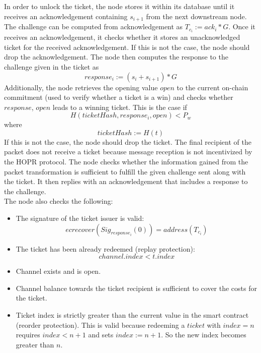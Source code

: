 In order to unlock the ticket, the node stores it within its database until it receives an acknowledgement containing $s_{i+1}$ from the next downstream node. 
The challenge can be computed from acknowledgement as $T_{c_i}:=ack_i*G$.
\newline Once it receives an acknowledgement, it checks whether it stores an unacknowledged ticket for the received acknowledgement. 
If this is not the case, the node should drop the acknowledgement.  
\newline The node then computes the response to the challenge given in the ticket as $$response_i:=(s_i+s_{i+1})*G$$
Additionally, the node retrieves the opening value $open$ to the current on-chain commitment (used to verify whether a ticket is a win) and checks whether $response$, $open$ leads to a winning ticket. 
This is the case if $$H( ticketHash, response_i, open ) <P_w$$ where $$ticketHash:=H(t)$$
If this is not the case, the node should drop the ticket. 
The final recipient of the packet does not receive a ticket because message reception is not incentivized by the HOPR protocol.
\newline The node checks whether the information gained from the packet transformation is sufficient to fulfill the given challenge sent along with the ticket. It then replies with an acknowledgement that includes a response to the challenge.
\\ The node also checks the following:
\begin{itemize}
    \item The signature of the ticket issuer is valid: $$ecrecover(Sig_{response_i}(0))=address(T_{c_i})$$
    \item The ticket has been already redeemed (replay protection): $$channel.index <t.index$$
    \item Channel exists and is open.
    \item Channel balance towards the ticket recipient is sufficient to cover the costs for the ticket.
    \item Ticket index is strictly greater than the current value in the smart contract (reorder protection). This is valid because redeeming a $ticket$ with $index=n$ requires $index < n+1$ and sets $index := n+1$. So the new index becomes greater than $n$.


\end{itemize}  








